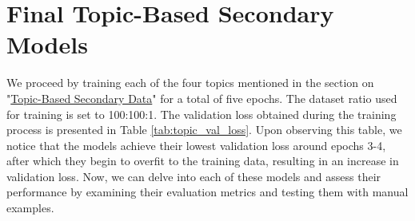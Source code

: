 \section{Final Topic-Based Secondary Models}

\begin{table}[ht]
    \centering
    \vspace{5pt}
    \caption{Validation loss collected during training across 5 epochs for each topic}
    \label{tab:topic_val_loss}
\end{table}

We proceed by training each of the four topics mentioned in the section on "\hyperref[topic_based_sec_data]{Topic-Based Secondary Data}" for a total of five epochs. The dataset ratio used for training is set to 100:100:1. The validation loss obtained during the training process is presented in Table \ref{tab:topic_val_loss}. Upon observing this table, we notice that the models achieve their lowest validation loss around epochs 3-4, after which they begin to overfit to the training data, resulting in an increase in validation loss. Now, we can delve into each of these models and assess their performance by examining their evaluation metrics and testing them with manual examples.

